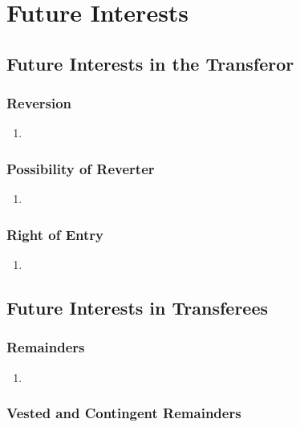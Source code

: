 \section{Future Interests}

\subsection{Future Interests in the Transferor}

\subsubsection{Reversion}

\begin{enumerate}
    \item %
\end{enumerate}

\subsubsection{Possibility of Reverter}

\begin{enumerate}
    \item %
\end{enumerate}

\subsubsection{Right of Entry}

\begin{enumerate}
    \item %
\end{enumerate}

\subsection{Future Interests in Transferees}

\subsubsection{Remainders}

\begin{enumerate}
    \item %
\end{enumerate}

\subsubsection{Vested and Contingent Remainders}

